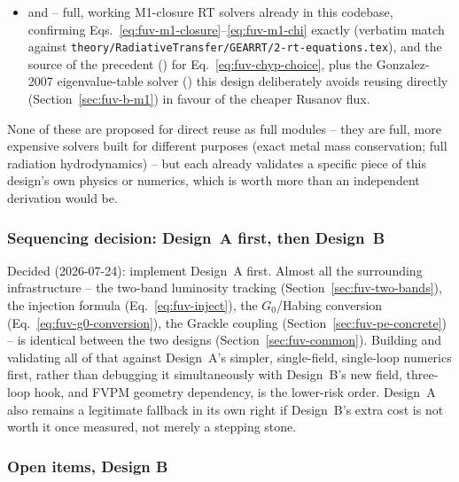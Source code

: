 \begin{itemize}
    over a jump to full second-order reconstruction and an exact/HLL
    solver;
  \item {} and  -- full, working M1-closure
    RT solvers already in this codebase, confirming
    Eqs.~\ref{eq:fuv-m1-closure}--\ref{eq:fuv-m1-chi} exactly (verbatim
    match against \texttt{theory/RadiativeTransfer/GEARRT/2-rt-equations.tex}),
    and the source of the  precedent
    () for Eq.~\ref{eq:fuv-chyp-choice},
    plus the Gonzalez-2007 eigenvalue-table solver
    () this design deliberately avoids
    reusing directly (Section~\ref{sec:fuv-b-m1}) in favour of the
    cheaper Rusanov flux.
\end{itemize}
None of these are proposed for direct reuse as full modules -- they are
full, more expensive solvers built for different purposes (exact metal
mass conservation; full radiation hydrodynamics) -- but each already
validates a specific piece of this design's own physics or numerics,
which is worth more than an independent derivation would be.

\subsubsection{Sequencing decision: Design~A first, then Design~B}
\label{sec:fuv-sequencing}

Decided (2026-07-24): implement Design~A first. Almost all the
surrounding infrastructure -- the two-band luminosity tracking
(Section~\ref{sec:fuv-two-bands}), the injection formula
(Eq.~\ref{eq:fuv-inject}), the $G_0$/Habing conversion
(Eq.~\ref{eq:fuv-g0-conversion}), the Grackle coupling
(Section~\ref{sec:fuv-pe-concrete}) -- is identical between the two
designs (Section~\ref{sec:fuv-common}). Building and validating all of
that against Design~A's simpler, single-field, single-loop numerics
first, rather than debugging it simultaneously with Design~B's new
field, three-loop hook, and FVPM geometry dependency, is the lower-risk
order. Design~A also remains a legitimate fallback in its own right if
Design~B's extra cost is not worth it once measured, not merely a
stepping stone.

\subsubsection{Open items, Design B}
\label{sec:fuv-design-b-open}

